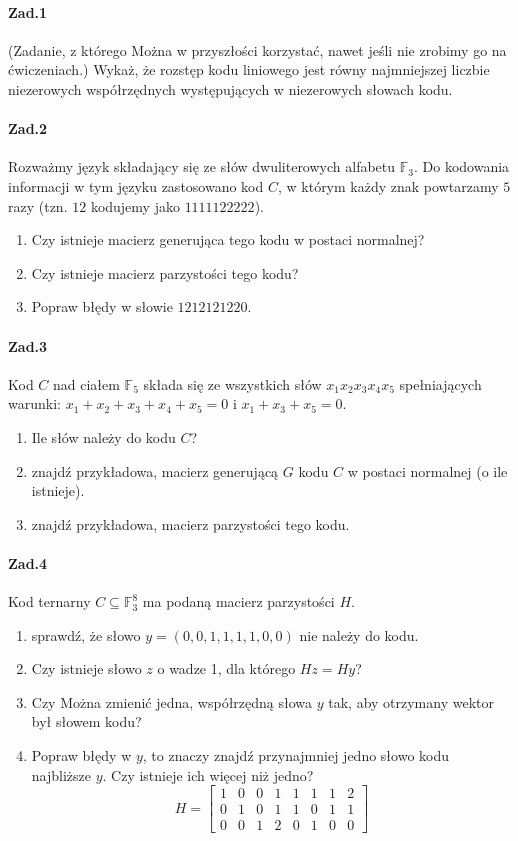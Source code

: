 \paragraph{Zad.1} (Zadanie, z którego Można w przyszłości korzystać, nawet jeśli nie zrobimy go na ćwiczeniach.) Wykaż, że rozstęp kodu liniowego jest równy najmniejszej liczbie niezerowych współrzędnych występujących w niezerowych słowach kodu.

\paragraph{Zad.2} Rozważmy język składający się ze słów dwuliterowych alfabetu $\mathbb{F}_3$. Do kodowania informacji w tym języku zastosowano kod $C$, w którym każdy znak powtarzamy $5$ razy (tzn. $12$ kodujemy jako $1111122222$).
\begin{enumerate}[label=\alph*)]
\item Czy istnieje macierz generująca tego kodu w postaci normalnej?
\item Czy istnieje macierz parzystości tego kodu?
\item Popraw błędy w słowie $1212121220$.
\end{enumerate}


\paragraph{Zad.3} Kod $C$ nad ciałem $\mathbb{F}_5$ składa się
ze wszystkich słów $x_1x_2x_3x_4x_5$ spełniających warunki:
$x_1 + x_2 + x_3 + x_4 + x_5 = 0$ i $x_1 + x_3 + x_5 = 0$.
\begin{enumerate}[label=\alph*)]
\item Ile słów należy do kodu $C$?
\item znajdź przykładowa, macierz generującą $G$ kodu $C$ w postaci normalnej (o ile istnieje).
\item znajdź przykładowa, macierz parzystości tego kodu.
\end{enumerate}

\paragraph{Zad.4} Kod ternarny $C\subseteq \mathbb{F}_3^8$ ma podaną macierz parzystości $H$.
\begin{enumerate}[label=\alph*)]
\item sprawdź, że słowo $y = (0, 0, 1, 1, 1, 1, 0, 0)$ nie należy do kodu.
\item Czy istnieje słowo $z$ o wadze 1, dla którego $Hz = Hy$?
\item Czy Można zmienić jedna, współrzędną słowa $y$ tak, aby otrzymany wektor był słowem kodu?
\item Popraw błędy w $y$, to znaczy znajdź przynajmniej jedno słowo kodu najbliższe $y$. Czy istnieje ich więcej niż jedno?
$$H =\begin{bmatrix}
1& 0& 0& 1& 1& 1& 1& 2\\
0& 1& 0& 1& 1& 0& 1& 1\\
0& 0& 1& 2& 0& 1& 0& 0
\end{bmatrix}$$
\end{enumerate}

